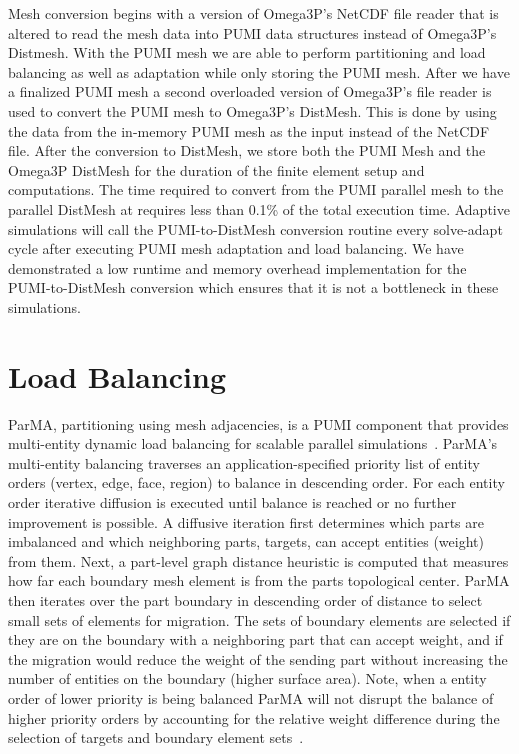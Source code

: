\documentclass[a4paper]{article}
\begin{document}
Mesh conversion begins with a version of Omega3P's NetCDF file reader that is altered
to read the mesh data into PUMI data structures instead of Omega3P's Distmesh. With 
the PUMI mesh we are able to perform partitioning and load balancing as well as adaptation 
while only storing the PUMI mesh. After we have a finalized PUMI mesh a second 
overloaded version of Omega3P's file reader is used to convert the PUMI mesh to 
Omega3P's DistMesh. This is done by using the data from the in-memory PUMI mesh as the 
input instead of the NetCDF file. After the conversion to DistMesh, we store both the
PUMI Mesh and the Omega3P DistMesh for the duration of the finite element setup and 
computations. The time required to convert from the PUMI parallel mesh to the
parallel DistMesh at requires less than 0.1\% of the total execution time.
Adaptive simulations will call the PUMI-to-DistMesh conversion routine every
solve-adapt cycle after executing PUMI mesh adaptation and load balancing.
We have demonstrated a low runtime and memory overhead implementation for the
PUMI-to-DistMesh conversion which ensures that it is not a bottleneck
in these simulations.

\section{Load Balancing}\label{sec:parma}
ParMA, partitioning using mesh adjacencies, is a PUMI component that provides
multi-entity dynamic load balancing for scalable parallel
simulations~\cite{SmithParma2015,zhou2012unstructured,Zhou2010}.
ParMA's multi-entity balancing traverses an
application-specified priority list of entity orders (vertex, edge, face,
region) to balance in descending order.
For each entity order iterative diffusion is executed until balance is reached
or no further improvement is possible.
A diffusive iteration first determines which parts are imbalanced and which
neighboring parts, targets, can accept entities (weight) from them.
Next, a part-level graph distance heuristic is computed that measures how far each
boundary mesh element is from the parts topological center.
ParMA then iterates over the part boundary in descending order of distance to
select small sets of elements for migration.
The sets of boundary elements are selected if they are on the boundary with a
neighboring part that can accept weight, and if the migration would reduce the
weight of the sending part without increasing the number of entities on the
boundary (higher surface area).
Note, when a entity order of lower priority is being balanced ParMA will not disrupt
the balance of higher priority orders by accounting for the relative weight
difference during the selection of targets and boundary element
sets~\cite{SmithParma2015}.
\end{document}
